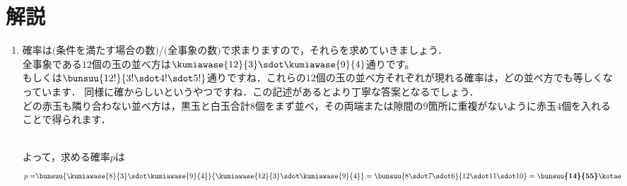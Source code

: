 \documentclass[../../../doc/main]{subfiles}
\begin{document}
    \setcounter{chapter}{2}
    \setcounter{section}{2}
    \section{解説}\label{解説2}
    \begin{enumerate}
        \item [\kakkoichi]
            \textcolor{myBlue2}{確率は$\text{(条件を満たす場合の数)}/\text{(全事象の数)}$で求まりますので，それらを求めていきましょう．} \\
            全事象である$12$個の玉の並べ方は$\kumiawase{12}{3}\sdot\kumiawase{9}{4}$通りです。 \\
            \textcolor{myBlue2}{もしくは$\bunsuu{12!}{3!\sdot4!\sdot5!}$通りですね．これらの$12$個の玉の並べ方それぞれが現れる確率は，どの並べ方でも等しくなっています．
            同様に確からしいというやつですね．この記述があるとより丁寧な答案となるでしょう．}\\
            どの赤玉も隣り合わない並べ方は，黒玉と白玉合計$8$個をまず並べ，その両端または隙間の$9$箇所に重複がないように赤玉$4$個を入れることで得られます．
            \begin{figure}[htbp]
                \centering
            \end{figure}\\
            よって，求める確率$p$は
            \begin{align*}
            p=&\bunsuu{\kumiawase{8}{3}\sdot\kumiawase{9}{4}}{\kumiawase{12}{3}\sdot\kumiawase{9}{4}}=\bunsuu{8\sdot7\sdot6}{12\sdot11\sdot10}=\boldsymbol{\bunsuu{14}{55}}\kotae

\end{align*}
\end{enumerate}
\end{document}

